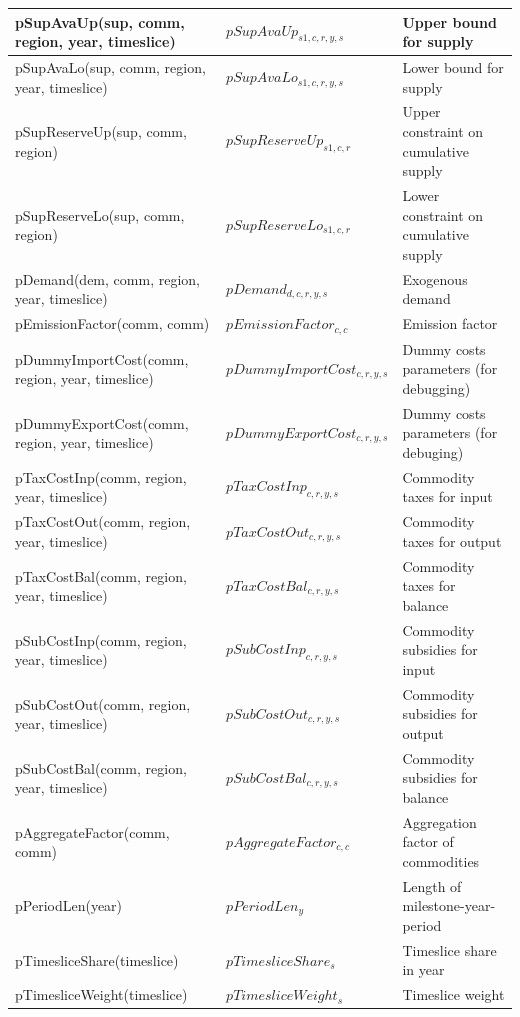 \documentclass{article}
\begin{document}
\begin{longtable}{|p{10cm}|p{5cm}|p{9cm}|}
 \hline
pSupAvaUp(sup, comm, region, year, timeslice) & $pSupAvaUp_{s1,c,r,y,s}$ & Upper bound for supply \\
 \hline
pSupAvaLo(sup, comm, region, year, timeslice) & $pSupAvaLo_{s1,c,r,y,s}$ & Lower bound for supply \\
 \hline
pSupReserveUp(sup, comm, region) & $pSupReserveUp_{s1,c,r}$ & Upper constraint on cumulative supply \\
 \hline
pSupReserveLo(sup, comm, region) & $pSupReserveLo_{s1,c,r}$ & Lower constraint on cumulative supply \\
 \hline
pDemand(dem, comm, region, year, timeslice) & $pDemand_{d,c,r,y,s}$ & Exogenous demand \\
 \hline
pEmissionFactor(comm, comm) & $pEmissionFactor_{c,c}$ & Emission factor \\
 \hline
pDummyImportCost(comm, region, year, timeslice) & $pDummyImportCost_{c,r,y,s}$ & Dummy costs parameters (for debugging) \\
 \hline
pDummyExportCost(comm, region, year, timeslice) & $pDummyExportCost_{c,r,y,s}$ & Dummy costs parameters (for debuging) \\
 \hline
pTaxCostInp(comm, region, year, timeslice) & $pTaxCostInp_{c,r,y,s}$ & Commodity taxes for input \\
 \hline
pTaxCostOut(comm, region, year, timeslice) & $pTaxCostOut_{c,r,y,s}$ & Commodity taxes for output \\
 \hline
pTaxCostBal(comm, region, year, timeslice) & $pTaxCostBal_{c,r,y,s}$ & Commodity taxes for balance \\
 \hline
pSubCostInp(comm, region, year, timeslice) & $pSubCostInp_{c,r,y,s}$ & Commodity subsidies for input \\
 \hline
pSubCostOut(comm, region, year, timeslice) & $pSubCostOut_{c,r,y,s}$ & Commodity subsidies for output \\
 \hline
pSubCostBal(comm, region, year, timeslice) & $pSubCostBal_{c,r,y,s}$ & Commodity subsidies for balance \\
 \hline
pAggregateFactor(comm, comm) & $pAggregateFactor_{c,c}$ & Aggregation factor of commodities \\
 \hline
pPeriodLen(year) & $pPeriodLen_{y}$ & Length of milestone-year-period \\
 \hline
pTimesliceShare(timeslice) & $pTimesliceShare_{s}$ & Timeslice share in year \\
 \hline
pTimesliceWeight(timeslice) & $pTimesliceWeight_{s}$ & Timeslice weight \\

\end{longtable}
\end{document}
